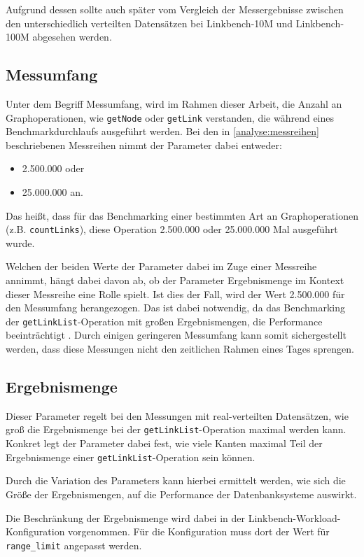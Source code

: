 Aufgrund dessen sollte auch später vom Vergleich der Messergebnisse zwischen den unterschiedlich verteilten Datensätzen bei Linkbench-10M und Linkbench-100M abgesehen werden.

\subsection{Messumfang}
Unter dem Begriff Messumfang, wird im Rahmen dieser Arbeit, die Anzahl an Graphoperationen, wie \texttt{getNode} oder \texttt{getLink} verstanden, die während eines Benchmarkdurchlaufs ausgeführt werden. Bei den in \autoref{analyse:messreihen} beschriebenen Messreihen nimmt der Parameter dabei entweder:
\begin{itemize}
    \item 2.500.000 oder
    \item 25.000.000 an. 
\end{itemize}
Das heißt, dass für das Benchmarking einer bestimmten Art an Graphoperationen (z.B. \texttt{countLinks}), diese Operation 2.500.000 oder 25.000.000 Mal ausgeführt wurde. 

Welchen der beiden Werte der Parameter dabei im Zuge einer Messreihe annimmt, hängt dabei davon ab, ob der Parameter  Ergebnismenge im Kontext dieser Messreihe eine Rolle spielt. Ist dies der Fall, wird der Wert 2.500.000 für den Messumfang herangezogen. Das ist dabei notwendig, da das Benchmarking der \texttt{getLinkList}-Operation mit großen Ergebnismengen, die Performance beeinträchtigt . Durch einigen geringeren Messumfang kann somit sichergestellt werden, dass diese Messungen nicht den zeitlichen Rahmen eines Tages sprengen.

\subsection{Ergebnismenge}
\label{analyse:parameter:ergebnismenge}
Dieser Parameter regelt bei den Messungen mit real-verteilten Datensätzen, wie groß die Ergebnismenge bei der \texttt{getLinkList}-Operation maximal werden kann. Konkret legt der Parameter dabei fest, wie viele Kanten maximal Teil der Ergebnismenge einer \texttt{getLinkList}-Operation sein können.

Durch die Variation des Parameters kann hierbei ermittelt werden, wie sich die Größe der Ergebnismengen, auf die Performance der Datenbanksysteme auswirkt. 

Die Beschränkung der Ergebnismenge wird dabei in der Linkbench-Workload-Konfiguration vorgenommen. Für die Konfiguration muss dort der Wert für \texttt{range\_limit} angepasst werden. 


